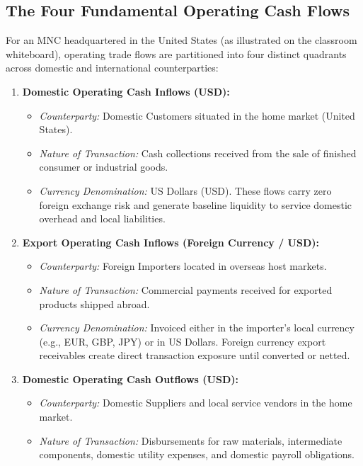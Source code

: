 \subsection{The Four Fundamental Operating Cash Flows}
For an MNC headquartered in the United States (as illustrated on the classroom whiteboard), operating trade flows are partitioned into four distinct quadrants across domestic and international counterparties:

\begin{enumerate}[leftmargin=1.8em, label=\textbf{\arabic*.}]
    \item \textbf{Domestic Operating Cash Inflows (USD):}
    \begin{itemize}[noitemsep]
        \item \textit{Counterparty:} Domestic Customers situated in the home market (United States).
        \item \textit{Nature of Transaction:} Cash collections received from the sale of finished consumer or industrial goods.
        \item \textit{Currency Denomination:} US Dollars (USD). These flows carry zero foreign exchange risk and generate baseline liquidity to service domestic overhead and local liabilities.
    \end{itemize}
    \item \textbf{Export Operating Cash Inflows (Foreign Currency / USD):}
    \begin{itemize}[noitemsep]
        \item \textit{Counterparty:} Foreign Importers located in overseas host markets.
        \item \textit{Nature of Transaction:} Commercial payments received for exported products shipped abroad.
        \item \textit{Currency Denomination:} Invoiced either in the importer's local currency (e.g., EUR, GBP, JPY) or in US Dollars. Foreign currency export receivables create direct transaction exposure until converted or netted.
    \end{itemize}
    \item \textbf{Domestic Operating Cash Outflows (USD):}
    \begin{itemize}[noitemsep]
        \item \textit{Counterparty:} Domestic Suppliers and local service vendors in the home market.
        \item \textit{Nature of Transaction:} Disbursements for raw materials, intermediate components, domestic utility expenses, and domestic payroll obligations.

\end{itemize}
\end{enumerate}
